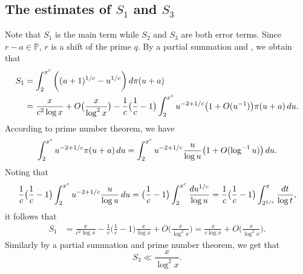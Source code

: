\documentclass[12pt, reqno, twoside, letterpaper]{amsart}
\numberwithin{equation}{section}
\newcommand{\PP}{\ensuremath{\mathbb{P}}}
\theoremstyle{customthm}
\theoremstyle{customrem}
\def\int{\intop\nolimits}
\begin{document}
\subsection{The estimates of $S_1$ and $S_3$}
Note that $S_1$ is the main term while $S_2$ and $S_3$ are both error terms. Since $r-a\in\PP$, $r$ is a shift of the prime $q$. By a partial summation and , we obtain that
\begin{align*}
\nonumber S_1 &= \int_{2}^{x^c} \bigg( (u+1)^{1/c}-u^{1/c} \bigg)\,d\pi(u+a) \\
&= \frac{x}{c^2\log x} +O\big(\frac{x}{\log^2x}\big) - \frac{1}{c}\big(\frac{1}{c}-1\big)\int_{2}^{x^c}u^{-2+1/c}\big(1+O(u^{-1})\big) \pi(u+a) \, du.
\end{align*}
According to prime number theorem, we have
$$
\int_{2}^{x^c}u^{-2+1/c} \pi(u+a) \, du = \int_{2}^{x^c}u^{-2+1/c} \frac{u}{\log u}\big(1+O(\log^{-1} u)\big) \, du.
$$
Noting that
$$
\frac{1}{c}\big(\frac{1}{c}-1\big)\int_{2}^{x^c}u^{-2+1/c} \frac{u}{\log u} \, du = \big(\frac{1}{c}-1\big) \int_{2}^{x^c}\frac{du^{1/c}}{\log u} = \frac{1}{c}\big(\frac{1}{c}-1\big) \int^{x}_{2^{1/c}} \frac{dt}{\log t},
$$
it follows that
\begin{align}
	\label{eq:bdS1}
S_1 &= \frac{x}{c^2\log x} - \frac{1}{c}\big(\frac{1}{c}-1\big) \frac{x}{\log x} + O\big(\frac{x}{\log^2x}\big) = \frac{x}{c\log x} + O\big(\frac{x}{\log^2x}\big).
\end{align}
Similarly by a partial summation and prime number theorem, we get that 
\begin{equation}
\label{eq:bdS3}
S_3 \ll \frac{x}{\log ^2x}.
\end{equation}
 
\end{document}

